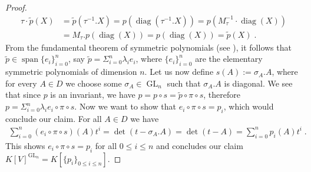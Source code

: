 \begin{proof}
\begin{equation*}
\begin{aligned}
      \tau\cdot \tilde{p} (X)
      &= \tilde{p} (\tau^{-1}.X)
      = p ( \operatorname{diag}(\tau^{-1}.X))
      = p( M_\tau^{-1} \cdot \operatorname{diag} (X)) \\
      &= M_\tau . p (\operatorname{diag}(X))
      = p (\operatorname{diag}(X))
      = \tilde{p} (X) \; .
    \end{aligned} 
  \end{equation*}
  From the fundamental theorem of symmetric polynomials (see \cite[p.~164]{Bos13}), it follows that $\tilde{p} \in \operatorname{span}\{e_i\}_{i=0}^n$, say $\tilde{p} = \Sigma_{i=0}^n \lambda_i e_i$, where $\{ e_i \}_{i=0}^n$ are the elementary symmetric polynomials of dimension $n$.
  Let us now define $s(A) := \sigma_A .A$, where for every $A \in D$ we choose some $\sigma_A \in \operatorname{GL}_n$ such that $\sigma_A .A$ is diagonal.
  We see that since $p$ is an invariant, we have $p = p \circ s = \tilde{p} \circ \pi \circ s$, therefore \linebreak$p = \Sigma_{i=0}^n \lambda_i e_i \circ \pi \circ s$.
  Now we want to show that $e_i \circ \pi \circ s = p_i$, which would conclude our claim.
  For all $A\in D$ we have
  \begin{equation*}
    \begin{aligned}
      \sum_{i=0}^n (e_i \circ \pi \circ s)(A)t^i
      =\operatorname{det}(t-\sigma_A.A)
      =\operatorname{det}(t-A)
      =\sum_{i=0}^n p_i(A)t^i \; .
    \end{aligned}
  \end{equation*}
  This shows $e_i \circ \pi \circ s = p_i$ for all $0\leq i \leq n$ and concludes our claim \linebreak$K[V]^{\operatorname{GL}_n} = K[\{p_i\}_{0\leq i\leq n}]$.
\end{proof}

